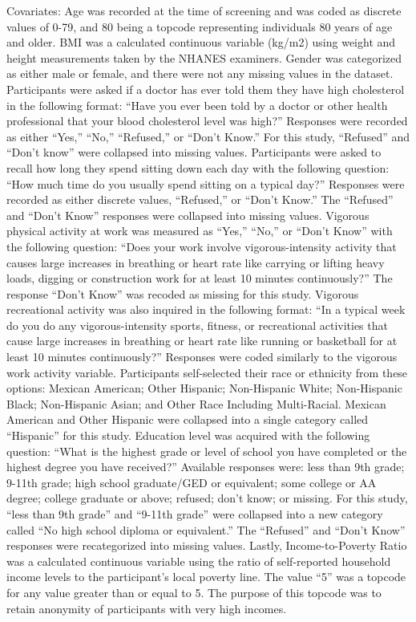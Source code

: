 \documentclass[]{elsarticle} %
\begin{document}
Covariates: Age was recorded at the time of screening and was coded as
discrete values of 0-79, and 80 being a topcode representing individuals
80 years of age and older. BMI was a calculated continuous variable
(kg/m2) using weight and height measurements taken by the NHANES
examiners. Gender was categorized as either male or female, and there
were not any missing values in the dataset. Participants were asked if a
doctor has ever told them they have high cholesterol in the following
format: ``Have you ever been told by a doctor or other health
professional that your blood cholesterol level was high?'' Responses
were recorded as either ``Yes,'' ``No,'' ``Refused,'' or ``Don't Know.''
For this study, ``Refused'' and ``Don't know'' were collapsed into
missing values. Participants were asked to recall how long they spend
sitting down each day with the following question: ``How much time do
you usually spend sitting on a typical day?'' Responses were recorded as
either discrete values, ``Refused,'' or ``Don't Know.'' The ``Refused''
and ``Don't Know'' responses were collapsed into missing values.
Vigorous physical activity at work was measured as ``Yes,'' ``No,'' or
``Don't Know'' with the following question: ``Does your work involve
vigorous-intensity activity that causes large increases in breathing or
heart rate like carrying or lifting heavy loads, digging or construction
work for at least 10 minutes continuously?'' The response ``Don't Know''
was recoded as missing for this study. Vigorous recreational activity
was also inquired in the following format: ``In a typical week do you do
any vigorous-intensity sports, fitness, or recreational activities that
cause large increases in breathing or heart rate like running or
basketball for at least 10 minutes continuously?'' Responses were coded
similarly to the vigorous work activity variable. Participants
self-selected their race or ethnicity from these options: Mexican
American; Other Hispanic; Non-Hispanic White; Non-Hispanic Black;
Non-Hispanic Asian; and Other Race Including Multi-Racial. Mexican
American and Other Hispanic were collapsed into a single category called
``Hispanic'' for this study. Education level was acquired with the
following question: ``What is the highest grade or level of school you
have completed or the highest degree you have received?'' Available
responses were: less than 9th grade; 9-11th grade; high school
graduate/GED or equivalent; some college or AA degree; college graduate
or above; refused; don't know; or missing. For this study, ``less than
9th grade'' and ``9-11th grade'' were collapsed into a new category
called ``No high school diploma or equivalent.'' The ``Refused'' and
``Don't Know'' responses were recategorized into missing values. Lastly,
Income-to-Poverty Ratio was a calculated continuous variable using the
ratio of self-reported household income levels to the participant's
local poverty line. The value ``5'' was a topcode for any value greater
than or equal to 5. The purpose of this topcode was to retain anonymity
of participants with very high incomes.
\end{document}
